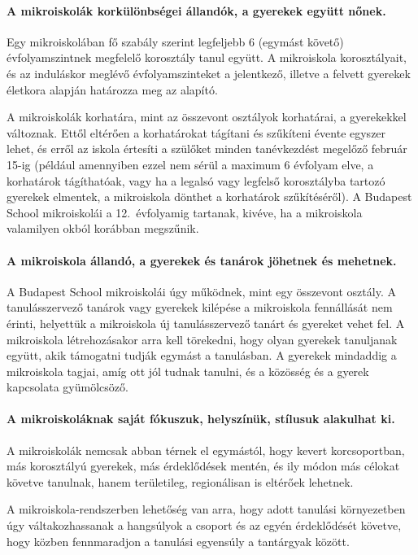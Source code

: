\paragraph{A mikroiskolák korkülönbségei állandók, a gyerekek együtt nőnek.}
Egy\linebreak
mikroiskolában fő szabály szerint legfeljebb 6 (egymást követő) évfolyamszintnek megfelelő korosztály tanul együtt. A mikroiskola korosztályait, és az induláskor meglévő évfolyamszinteket a jelentkező, illetve a felvett gyerekek életkora alapján határozza meg az alapító.

A mikroiskolák korhatára, mint az összevont osztályok korhatárai, a gyerekekkel változnak. Ettől eltérően a korhatárokat tágítani és szűkíteni évente egyszer lehet, és erről az iskola értesíti a szülőket minden tanévkezdést megelőző február 15-ig (például amennyiben ezzel nem sérül a maximum 6 évfolyam elve, a korhatárok tágíthatóak, vagy ha a legalsó vagy legfelső korosztályba tartozó gyerekek elmentek, a mikroiskola dönthet a korhatárok szűkítéséről). A Budapest School mikroiskolái a 12.~évfolyamig tartanak, kivéve, ha a mikroiskola valamilyen okból korábban megszűnik.

\paragraph{A mikroiskola állandó, a gyerekek és tanárok jöhetnek és
  mehetnek.}\hfil\break
A Budapest School mikroiskolái úgy működnek, mint egy összevont
osztály. A tanulásszervező tanárok vagy gyerekek kilépése a
mikroiskola\linebreak
fennállását nem érinti, helyettük a mikroiskola új tanulásszervező tanárt és gyereket vehet fel.  A mikroiskola létrehozásakor arra kell törekedni, hogy olyan gyerekek tanuljanak együtt, akik támogatni tudják egymást a tanulásban. A gyerekek mindaddig a mikroiskola tagjai, amíg ott jól tudnak tanulni, és a közösség és a gyerek kapcsolata gyümölcsöző.

\paragraph{A mikroiskoláknak saját fókuszuk, helyszínük, stílusuk
  alakulhat ki.}\hfil\break
A mikroiskolák nemcsak abban térnek el egymástól, hogy kevert korcsoportban, más korosztályú gyerekek, más érdeklődések mentén, és ily módon más célokat követve tanulnak, hanem területileg, regionálisan is eltérőek lehetnek.

A mikroiskola-rendszerben lehetőség van arra, hogy adott tanulási környezetben úgy váltakozhassanak a hangsúlyok a csoport és az egyén érdeklődését követve, hogy közben fennmaradjon a tanulási egyensúly a tantárgyak között.

